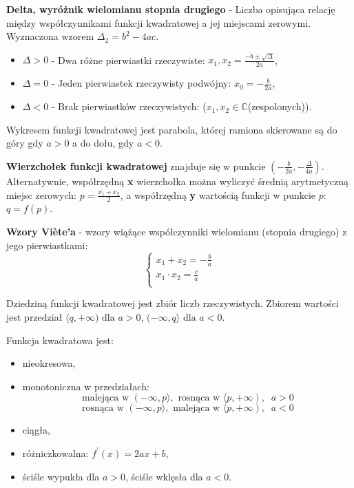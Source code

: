 \documentclass[14pt,a4paper]{extarticle}
\begin{document}
\noindent\textbf{Delta, wyróżnik wielomianu stopnia drugiego} - Liczba opisująca relację między współczynnikami funkcji 
kwadratowej a jej miejscami zerowymi. Wyznaczona wzorem $\Delta_{2} = b^{2} - 4ac$.
\begin{itemize}
   \item $\Delta > 0$ - Dwa różne pierwiastki rzeczywiste: $x_{1}, x_{2} = \frac{-b \pm\sqrt{\Delta}}{2a}$,
   \item $\Delta = 0$ - Jeden pierwiastek rzeczywisty podwójny: $x_{0} = -\frac{b}{2a}$,
   \item $\Delta < 0$ - Brak pierwiastków rzeczywistych: ($x_{1}, x_{2} \in \mathbb{C}$\;(zespolonych)).
\end{itemize}

\noindent Wykresem funkcji kwadratowej jest parabola, której ramiona skierowane są do góry gdy $a > 0$ a do dołu,
gdy $a < 0$.\hfill\break


\noindent\textbf{Wierzchołek funkcji kwadratowej} znajduje się w punkcie $\left(-\frac{b}{2a}, -\frac{\Delta}{4a}\right)$.
Alternatywnie, współrzędną \textbf{x} wierzchołka można wyliczyć średnią arytmetyczną miejsc zerowych: $p = \frac{x_{1} + x_{2}}{2}$, a 
współrzędną \textbf{y} wartością funkcji w punkcie $p$: $q = f(p)$.\hfill\break

\noindent\textbf{Wzory Viète'a} - wzory wiążące współczynniki wielomianu (stopnia drugiego) z jego pierwiastkami:\hfill\break
\begin{equation*}
   \left\{
      \begin{array}{ll}
         \!\!\!\!x_{1} + x_{2} = -\frac{\displaystyle b}{\displaystyle a}\\
         \!\!\!\!x_{1}\cdot x_{2} = \frac{\displaystyle c}{\displaystyle a}\\
      \end{array}
   \right.
   \end{equation*}

\noindent Dziedziną funkcji kwadratowej jest zbiór liczb rzeczywistych. Zbiorem wartości jest przedział
$\langle q, +\infty) \text{ dla } a > 0$, $(-\infty, q\rangle \text{ dla } a < 0$.\hfill\break

\noindent Funkcja kwadratowa jest:
\begin{itemize}
   \item nieokresowa,
   \item monotoniczna w przedziałach:
   $$\text{malejąca w }(-\infty, p\rangle, \text{ rosnąca w } \langle p, +\infty),\;\; a > 0$$
   $$\text{rosnąca w }(-\infty, p\rangle, \text{ malejąca w } \langle p, +\infty),\;\; a < 0$$
   \item ciągła,
   \item różniczkowalna: $f^{\prime}(x) = 2ax + b$,
   \item ściśle wypukła dla $a > 0$, ściśle wklęsła dla $a < 0$.

\end{itemize}
\end{document}

